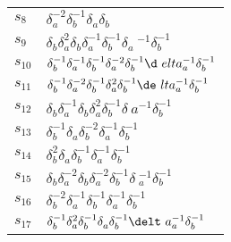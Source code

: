 \documentclass{article}
\begin{document}
\begin{center}
\begin{tabular}{ll}
$s_{8}$ & $\delta_a^{-2}\delta_b^{-1}\delta_a^{}\delta_b^{}$ \\
$s_{9}$ & $\delta_b^{}\delta_a^{2}\delta_b^{}\delta_a^{-1}\delta_b^{-1}\delta_a\
^{-1}\delta_b^{-1}$ \\
$s_{10}$ & $\delta_b^{-1}\delta_a^{-1}\delta_b^{-1}\delta_a^{-2}\delta_b^{-1}\d\
elta_a^{-1}\delta_b^{-1}$ \\
$s_{11}$ & $\delta_b^{-1}\delta_a^{-2}\delta_b^{-1}\delta_a^{2}\delta_b^{-1}\de\
lta_a^{-1}\delta_b^{-1}$ \\
$s_{12}$ & $\delta_b^{}\delta_a^{-1}\delta_b^{}\delta_a^{2}\delta_b^{-1}\delta_\
a^{-1}\delta_b^{-1}$ \\
$s_{13}$ & $\delta_b^{-1}\delta_a^{}\delta_b^{-2}\delta_a^{-1}\delta_b^{-1}$ \\
$s_{14}$ & $\delta_b^{2}\delta_a^{}\delta_b^{-1}\delta_a^{-1}\delta_b^{-1}$ \\
$s_{15}$ & $\delta_b^{}\delta_a^{-2}\delta_b^{}\delta_a^{-2}\delta_b^{-1}\delta\
_a^{-1}\delta_b^{-1}$ \\
$s_{16}$ & $\delta_b^{-2}\delta_a^{-1}\delta_b^{-1}\delta_a^{-1}\delta_b^{-1}$ 
\\
$s_{17}$ & $\delta_b^{-1}\delta_a^{2}\delta_b^{-1}\delta_a^{}\delta_b^{-1}\delt\
a_a^{-1}\delta_b^{-1}$ \\
\bottomrule
\end{tabular}
\end{center}

\thispagestyle{empty}
\end{document}
